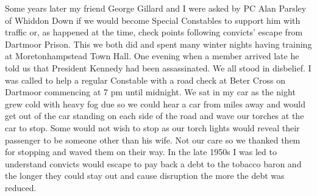 Some years later my friend George Gillard and I were asked by PC Alan Parsley of
Whiddon Down if we would become Special Constables to support him with traffic
or, as happened at the time, check points following convicts' escape from
Dartmoor Prison. This we both did and spent many winter nights having training
at Moretonhampstead Town Hall. One evening when a member arrived late he told
us that President Kennedy had been assassinated. We all stood in disbelief. I
was called to help a regular Constable with a road check at Beter Cross on
Dartmoor commencing at 7 pm until midnight. We sat in my car as the night grew
cold with heavy fog due so we could hear a car from miles away and would get
out of the car standing on each side of the road and wave our torches at the
car to stop. Some would not wish to stop as our torch lights would reveal their
passenger to be someone other than his wife. Not our care so we thanked them
for stopping and waved them on their way. In the late 1950s I was led to
understand convicts would escape to pay back a debt to the tobacco baron and
the longer they could stay out and cause disruption the more the debt was
reduced.

